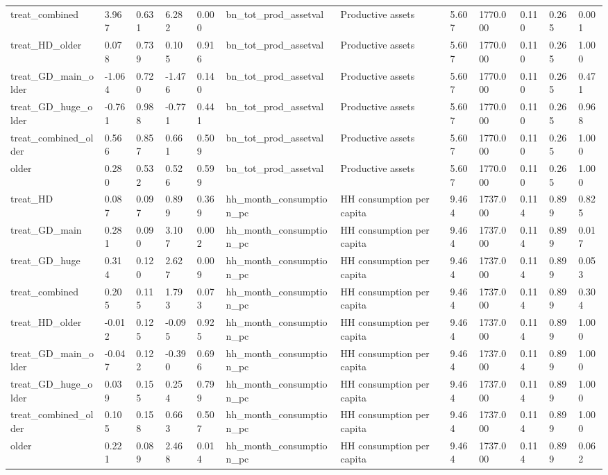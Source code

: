 \begin{tabular}{llllllllllll}
treat\_combined & 3.967 & 0.631 & 6.282 & 0.000 & bn\_tot\_prod\_assetval & Productive assets & 5.607 & 1770.000 & 0.110 & 0.265 & 0.001 \\
treat\_HD\_older & 0.078 & 0.739 & 0.105 & 0.916 & bn\_tot\_prod\_assetval & Productive assets & 5.607 & 1770.000 & 0.110 & 0.265 & 1.000 \\
treat\_GD\_main\_older & -1.064 & 0.720 & -1.476 & 0.140 & bn\_tot\_prod\_assetval & Productive assets & 5.607 & 1770.000 & 0.110 & 0.265 & 0.471 \\
treat\_GD\_huge\_older & -0.761 & 0.988 & -0.771 & 0.441 & bn\_tot\_prod\_assetval & Productive assets & 5.607 & 1770.000 & 0.110 & 0.265 & 0.968 \\
treat\_combined\_older & 0.566 & 0.857 & 0.661 & 0.509 & bn\_tot\_prod\_assetval & Productive assets & 5.607 & 1770.000 & 0.110 & 0.265 & 1.000 \\
older & 0.280 & 0.532 & 0.526 & 0.599 & bn\_tot\_prod\_assetval & Productive assets & 5.607 & 1770.000 & 0.110 & 0.265 & 1.000 \\
treat\_HD & 0.087 & 0.097 & 0.899 & 0.369 & hh\_month\_consumption\_pc & HH consumption per capita & 9.464 & 1737.000 & 0.114 & 0.899 & 0.825 \\
treat\_GD\_main & 0.281 & 0.090 & 3.107 & 0.002 & hh\_month\_consumption\_pc & HH consumption per capita & 9.464 & 1737.000 & 0.114 & 0.899 & 0.017 \\
treat\_GD\_huge & 0.314 & 0.120 & 2.627 & 0.009 & hh\_month\_consumption\_pc & HH consumption per capita & 9.464 & 1737.000 & 0.114 & 0.899 & 0.053 \\
treat\_combined & 0.205 & 0.115 & 1.793 & 0.073 & hh\_month\_consumption\_pc & HH consumption per capita & 9.464 & 1737.000 & 0.114 & 0.899 & 0.304 \\
treat\_HD\_older & -0.012 & 0.125 & -0.095 & 0.925 & hh\_month\_consumption\_pc & HH consumption per capita & 9.464 & 1737.000 & 0.114 & 0.899 & 1.000 \\
treat\_GD\_main\_older & -0.047 & 0.122 & -0.390 & 0.696 & hh\_month\_consumption\_pc & HH consumption per capita & 9.464 & 1737.000 & 0.114 & 0.899 & 1.000 \\
treat\_GD\_huge\_older & 0.039 & 0.155 & 0.254 & 0.799 & hh\_month\_consumption\_pc & HH consumption per capita & 9.464 & 1737.000 & 0.114 & 0.899 & 1.000 \\
treat\_combined\_older & 0.105 & 0.158 & 0.663 & 0.507 & hh\_month\_consumption\_pc & HH consumption per capita & 9.464 & 1737.000 & 0.114 & 0.899 & 1.000 \\
older & 0.221 & 0.089 & 2.468 & 0.014 & hh\_month\_consumption\_pc & HH consumption per capita & 9.464 & 1737.000 & 0.114 & 0.899 & 0.062 \\
\bottomrule
\end{tabular}
